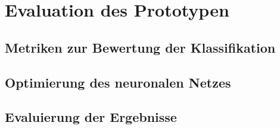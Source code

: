 \chapter{Evaluation des Prototypen}

\section{Metriken zur Bewertung der Klassifikation}

\section{Optimierung des neuronalen Netzes}

\section{Evaluierung der Ergebnisse}